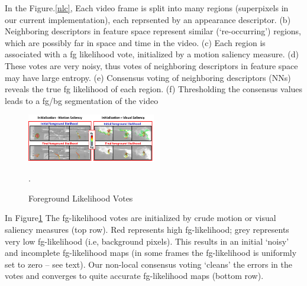 In the Figure.\ref{nlc}, Each video frame is split into many regions (superpixels in
our current implementation), each reprsented by an appearance descriptor. (b) Neighboring descriptors
in feature space represent similar (‘re-occurring’) regions, which are possibly far in space and time
in the video. (c) Each region is associated with a fg likelihood vote, initialized by a motion saliency
measure. (d) These votes are very noisy, thus votes of neighboring descriptors in feature space may
have large entropy. (e) Consensus voting of neighboring descriptors (NNs) reveals the true fg likelihood
of each region. (f) Thresholding the consensus values leads to a fg/bg segmentation of the video
\begin{figure}[ht]
    \centering
    \includegraphics[width=0.5\textwidth]{figure/NLC_voting.png}
    \caption{Foreground Likelihood Votes}.
    \label{voting}
\end{figure}

In Figure\ref{voting} The fg-likelihood votes are initialized by crude motion
or visual saliency measures (top row). Red represents high fg-likelihood; grey represents very low
fg-likelihood (i.e, background pixels). This results in an initial ‘noisy’ and incomplete fg-likelihood
maps (in some frames the fg-likelihood is uniformly set to zero – see text). Our non-local consensus
voting ‘cleans’ the errors in the votes and converges to quite accurate fg-likelihood maps (bottom row).

